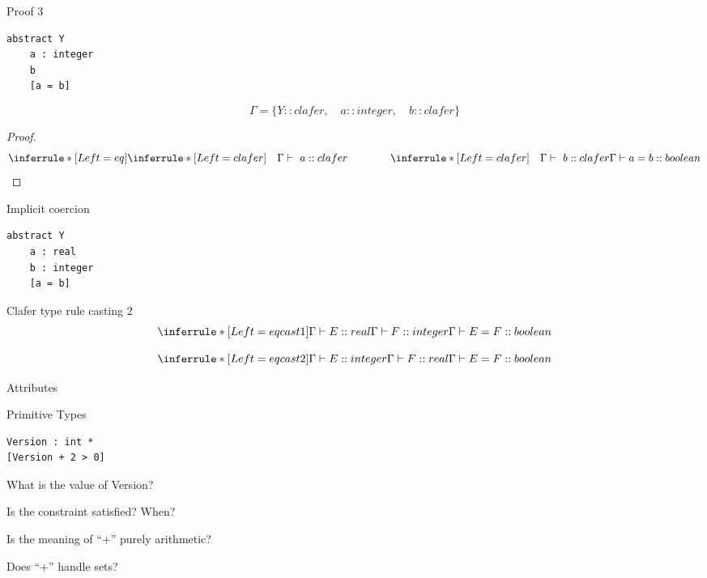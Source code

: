 \documentclass[table,15pt,t]{beamer}
\newcommand{\vmiddle}[1]{
  \vspace{\stretch{1}}
  #1
  \vspace{\stretch{1}}
}
\newcommand{\interframe}[1]{
\begin{frame}{}
\vmiddle{\hmiddle{\Huge #1}}
\end{frame}
}
\newcommand{\hmiddle}[1]{
  \begin{center}#1\end{center}
}
\begin{document}
\begin{frame}[fragile,c]{Proof 3}
\begin{lstlisting}
abstract Y
    a : integer
    b
    [a = b]
\end{lstlisting}

\begin{equation*}
\Gamma = \{Y::clafer,\quad a::integer,\quad b::clafer\}
\end{equation*}


\begin{proof}
\begin{equation*}
\inferrule* [Left=eq] {
  \inferrule* [Left=clafer]{\quad}{\Gamma\vdash\ a::clafer} \\ \hspace{40pt} 
  \inferrule* [Left=clafer]{\quad}{\Gamma\vdash\ b::clafer}}
{\Gamma\vdash a = b::boolean}
\end{equation*}
\end{proof}
\end{frame}

\begin{frame}[fragile,c]{Implicit coercion}
\begin{lstlisting}
abstract Y
    a : real
    b : integer
    [a = b]
\end{lstlisting}
\end{frame}

\begin{frame}[fragile,c]{Clafer type rule casting 2}
\begin{equation*}
\inferrule* [Left=eqcast1] {\Gamma\vdash E::real \\ \Gamma\vdash F::integer}{\Gamma\vdash E = F::boolean}
\end{equation*}

\begin{equation*}
\inferrule* [Left=eqcast2] {\Gamma\vdash E::integer \\ \Gamma\vdash F::real}{\Gamma\vdash E = F::boolean}
\end{equation*}
\end{frame}


\interframe{Attributes}

\begin{frame}[fragile,c]{Primitive Types}
\begin{lstlisting}
Version : int *
[Version + 2 > 0]
\end{lstlisting}\pause
\begin{list}{}{}
    \item What is the value of Version?\pause
    \item Is the constraint satisfied? When?\pause
    \item Is the meaning of ``+'' purely arithmetic?\pause
    \item Does ``+'' handle sets?
\end{list}
\end{frame}
\end{document}
